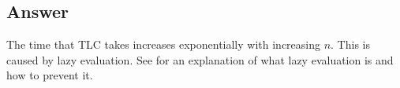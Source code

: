 \documentclass[fleqn,leqno]{article}
\begin{document}
\subsection*{Answer} 

The time that TLC takes increases exponentially with increasing $n$.
This is caused by lazy evaluation.  See
for an explanation of what lazy evaluation is and how to prevent it.
\end{document}
